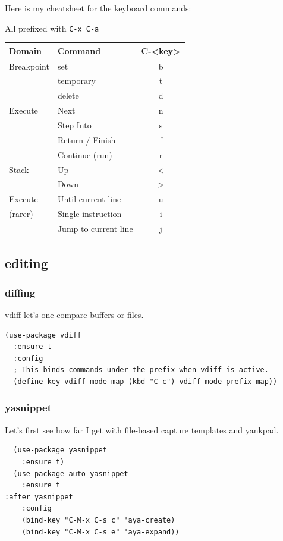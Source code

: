 \documentclass[11pt]{article}
\begin{document}
Here is my cheatsheet for the keyboard commands:

All prefixed with \texttt{C-x C-a}

\begin{center}
\begin{tabular}{llc}
\hline
Domain & Command & C-<key>\\
\hline
Breakpoint & set & b\\
 & temporary & t\\
 & delete & d\\
\hline
Execute & Next & n\\
 & Step Into & s\\
 & Return / Finish & f\\
 & Continue (run) & r\\
\hline
Stack & Up & <\\
 & Down & >\\
\hline
Execute & Until current line & u\\
(rarer) & Single instruction & i\\
 & Jump to current line & j\\
\hline
\end{tabular}
\end{center}
\subsection{editing}
\label{sec:orgf6367fe}
\subsubsection{diffing}
\label{sec:org4209ed5}
\href{https://github.com/justbur/emacs-vdiff}{
vdiff} let's one compare buffers or files.

\begin{verbatim}
(use-package vdiff
  :ensure t
  :config
  ; This binds commands under the prefix when vdiff is active.
  (define-key vdiff-mode-map (kbd "C-c") vdiff-mode-prefix-map))
\end{verbatim}

\subsubsection{yasnippet}
\label{sec:org74deb3e}
Let's first see how far I get with file-based capture templates and yankpad.

\begin{verbatim}
  (use-package yasnippet
    :ensure t)
  (use-package auto-yasnippet
    :ensure t
:after yasnippet
    :config
    (bind-key "C-M-x C-s c" 'aya-create)
    (bind-key "C-M-x C-s e" 'aya-expand))
\end{verbatim}
\end{document}
